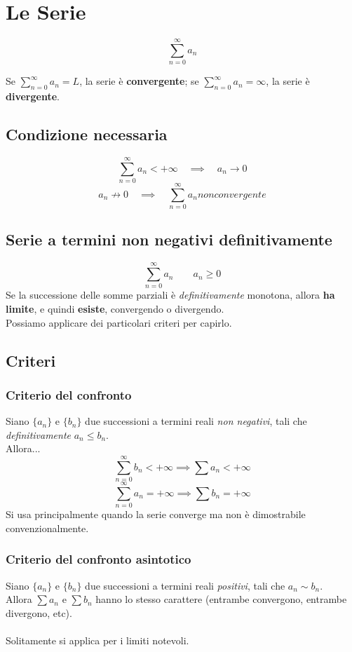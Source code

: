 \documentclass{article}
\begin{document}
\section{Le Serie}

\[\sum^{\infty}_{n=0}a_n\]

Se \(\sum^{\infty}_{n=0}a_n = L\), la serie è \textbf{convergente}; se \(\sum^{\infty}_{n=0}a_n = \infty\), la serie è \textbf{divergente}.

\subsection{Condizione necessaria}
\[\sum^{\infty}_{n=0}a_n < +\infty \quad \implies \quad a_n \to 0\]
\[a_n \not\to 0 \quad \implies \quad \sum^{\infty}_{n=0}a_n non convergente\]

\subsection{Serie a termini non negativi definitivamente}
\[\sum^{\infty}_{n=0}a_n \qquad a_n \geq 0\]
Se la successione delle somme parziali è \textit{definitivamente} monotona, allora \textbf{ha limite}, e quindi \textbf{esiste}, convergendo o divergendo.\\
Possiamo applicare dei particolari criteri per capirlo.

\subsection{Criteri}

\subsubsection{Criterio del confronto}
Siano \(\{a_n\}\) e \(\{b_n\}\) due successioni a termini reali \textit{non negativi}, tali che \textit{definitivamente} \(a_n \leq b_n\).\\
Allora...
\[\sum^{\infty}_{n=0} b_n < +\infty \implies \sum a_n < +\infty\]
\[\sum^{\infty}_{n=0} a_n = +\infty \implies \sum b_n = +\infty\]
Si usa principalmente quando la serie converge ma non è dimostrabile convenzionalmente.

\subsubsection{Criterio del confronto asintotico}
Siano \(\{a_n\}\) e \(\{b_n\}\) due successioni a termini reali \textit{positivi}, tali che \(a_n \sim b_n\).\\
Allora \(\sum a_n\) e \(\sum b_n\) hanno lo stesso carattere (entrambe convergono, entrambe divergono, etc).\\
\\
Solitamente si applica per i limiti notevoli.
\end{document}
